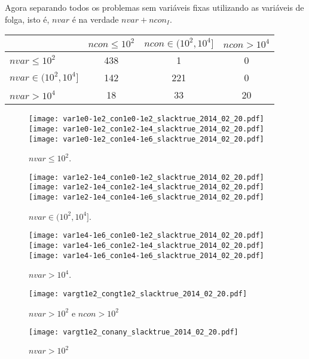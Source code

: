 \documentclass{article}
\begin{document}
Agora separando todos os problemas sem variáveis fixas utilizando as variáveis
de folga, isto é, $nvar$ é na verdade $nvar+ncon_I$.
\begin{center}
\begin{tabular}{|l|c|c|c|} \hline
& $ncon \leq 10^2$ & $ncon \in (10^2,10^4]$ & $ncon > 10^4$ \\ \hline
$nvar \leq 10^2$       & 438 &   1 &  0 \\ \hline
$nvar \in (10^2,10^4]$ & 142 & 221 &  0 \\ \hline
$nvar > 10^4$          &  18 &  33 & 20 \\ \hline
\end{tabular}
\end{center}

\begin{figure}[H]
\centering
\texttt{[image: var1e0-1e2\_con1e0-1e2\_slacktrue\_2014\_02\_20.pdf]}
\texttt{[image: var1e0-1e2\_con1e2-1e4\_slacktrue\_2014\_02\_20.pdf]}
\texttt{[image: var1e0-1e2\_con1e4-1e6\_slacktrue\_2014\_02\_20.pdf]}
\caption{ $nvar \leq 10^2$. }
\label{fig:nvar_small}
\end{figure}
\begin{figure}[H]
\centering
\texttt{[image: var1e2-1e4\_con1e0-1e2\_slacktrue\_2014\_02\_20.pdf]}
\texttt{[image: var1e2-1e4\_con1e2-1e4\_slacktrue\_2014\_02\_20.pdf]}
\texttt{[image: var1e2-1e4\_con1e4-1e6\_slacktrue\_2014\_02\_20.pdf]}
\caption{ $nvar \in (10^2,10^4]$. }
\label{fig:nvar_medium}
\end{figure}
\begin{figure}[H]
\centering
\texttt{[image: var1e4-1e6\_con1e0-1e2\_slacktrue\_2014\_02\_20.pdf]}
\texttt{[image: var1e4-1e6\_con1e2-1e4\_slacktrue\_2014\_02\_20.pdf]}
\texttt{[image: var1e4-1e6\_con1e4-1e6\_slacktrue\_2014\_02\_20.pdf]}
\caption{ $nvar > 10^4$. }
\label{fig:nvar_big}
\end{figure}

\begin{figure}[H]
\centering
\texttt{[image: vargt1e2\_congt1e2\_slacktrue\_2014\_02\_20.pdf]}
\caption{ $nvar > 10^2$ e $ncon > 10^2$ }
\label{fig:both_medium_and_big}
\end{figure}

\begin{figure}[H]
\centering
\texttt{[image: vargt1e2\_conany\_slacktrue\_2014\_02\_20.pdf]}
\caption{ $nvar > 10^2$ }
\label{fig:nvar_medium_and_big}
\end{figure}
\end{document}
